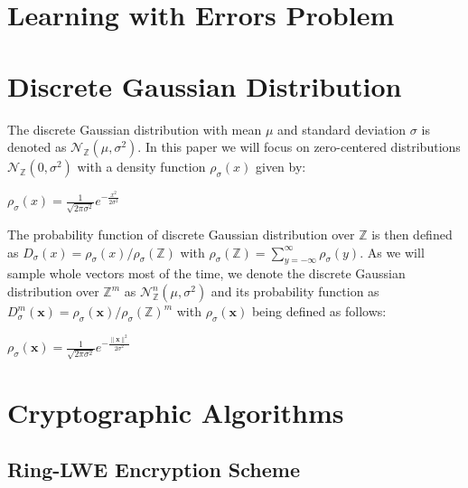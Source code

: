 \section{Learning with Errors Problem}

\section{Discrete Gaussian Distribution}
The discrete Gaussian distribution with mean \(\mu\) and standard deviation \(\sigma\) is denoted as \(\mathcal{N}_\mathbb{Z} (\mu, \sigma^2)\). In this paper we will focus on zero-centered distributions \(\mathcal{N}_\mathbb{Z} (0, \sigma^2)\) with a density function \(\rho_\sigma(x)\) given by:
\begin{center}
	\(\rho_\sigma(x)=\frac{1}{\sqrt{2\pi \sigma^2}}e^{-\frac{x^2}{2\sigma^2}}\)
\end{center}
The probability function of discrete Gaussian distribution over \(\mathbb{Z}\) is then defined as \(D_\sigma(x)=\rho_\sigma(x)/\rho_\sigma(\mathbb{Z})\) with \(\rho_\sigma(\mathbb{Z})=\sum_{y=-\infty}^{\infty} \rho_\sigma(y)\). As we will sample whole vectors most of the time, we denote the discrete Gaussian distribution over \(\mathbb{Z}^m\) as \(\mathcal{N}_\mathbb{Z}^{n} (\mu, \sigma^2)\) and its probability function as \(D_\sigma^m(\textbf{x})=\rho_\sigma(\textbf{x})/\rho_\sigma(\mathbb{Z})^m\) with \(\rho_\sigma(\textbf{x})\) being defined as follows:
\begin{center}
	\(\rho_\sigma(\textbf{x})=\frac{1}{\sqrt{2\pi \sigma^2}}e^{-\frac{\|\textbf{x}\|^2}{2\sigma^2}}\)
\end{center}
\section{Cryptographic Algorithms}

\subsection{Ring-LWE Encryption Scheme}

